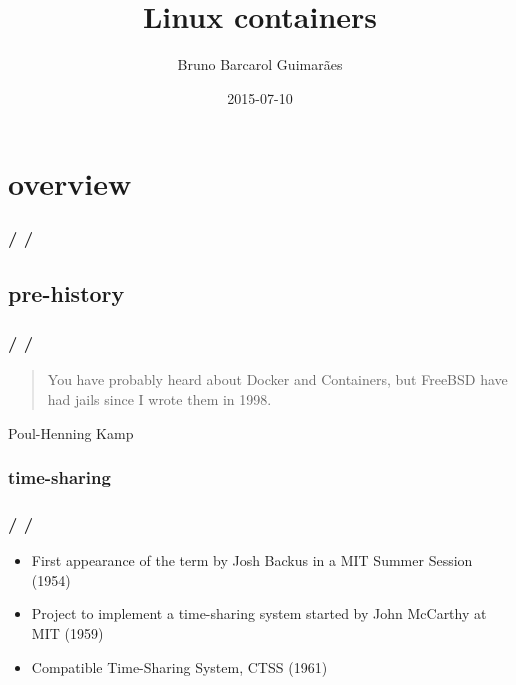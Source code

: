 \documentclass{beamer}
\title{Linux containers}
\author{Bruno Barcarol Guimarães}
\institute[]{\textit{bbguimaraes.com}}
\date{2015-07-10}
\newcommand{\autotitle}
{\frametitle{
    \secname
    \ifx\insertsubsection\empty
    \else
        /\subsecname
        \ifx\insertsubsubsection\empty\else/\subsubsecname\fi
    \fi}}
\begin{document}
\begin{frame}
    \titlepage
\end{frame}

\section{overview}

\begin{frame}
    \autotitle
    \tableofcontents
\end{frame}

\subsection{pre-history}

\begin{frame}
    \autotitle
    \begin{quote}
        You have probably heard about Docker and Containers, but FreeBSD
        have had jails since I wrote them in 1998.
    \end{quote}
    Poul-Henning Kamp
    \cite{kamp_varnish}
\end{frame}

\subsubsection{time-sharing}

\begin{frame}
    \autotitle
    \begin{itemize}
        \item
            First appearance of the term by Josh Backus in a MIT Summer Session
            (1954)
        \item
            Project to implement a time-sharing system started by John McCarthy
            at MIT (1959)
        \item Compatible Time-Sharing System, CTSS (1961)
    \end{itemize}
\end{frame}
\end{document}

